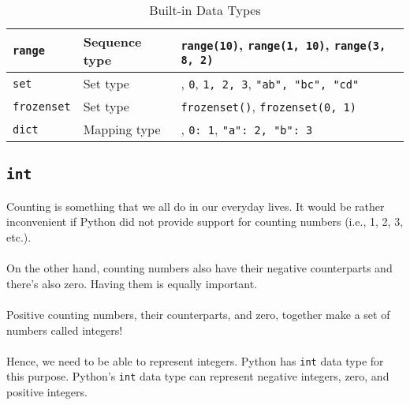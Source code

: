 \begin{table}[H]
\begin{tabular}{p{0.15\linewidth}p{0.25\linewidth}p{0.60\linewidth}}
        \texttt{range} & Sequence type & \texttt{range(10)},
                                                     \texttt{range(1, 10)},
                                                     \texttt{range(3, 8, 2)}}\\
        \midrule

        \texttt{set} & Set type & \texttt{{}},
                                              \texttt{{0}},
                                              \texttt{{1, 2, 3}},
                                              \texttt{{"ab", "bc", "cd"}}\\
        \midrule

        \texttt{frozenset} & Set type & \texttt{frozenset({})},
                                                    \texttt{frozenset({0, 1})}\\
        \midrule

        \texttt{dict} & Mapping type & \texttt{{}},
                                                   \texttt{{0: 1}},
                                                   \texttt{{"a": 2, "b": 3}}\\
        \bottomrule
    \end{tabular}
    \caption{Built-in Data Types}
    \label{tb.data.types}
\end{table}

\subsection{\texttt{int}}

Counting is something that we all do in our everyday lives. It would be rather inconvenient if
Python did not provide support for counting numbers (i.e., 1, 2, 3, etc.).
\\\\
On the other hand, counting numbers also have their negative counterparts and there's also zero.
Having them is equally important.
\\\\
Positive counting numbers, their counterparts, and zero, together make a set of numbers called
integers!
\\\\
Hence, we need to be able to represent integers. Python has \texttt{int} data type for
this purpose. Python's \texttt{int} data type can represent negative integers, zero, and
positive integers.

